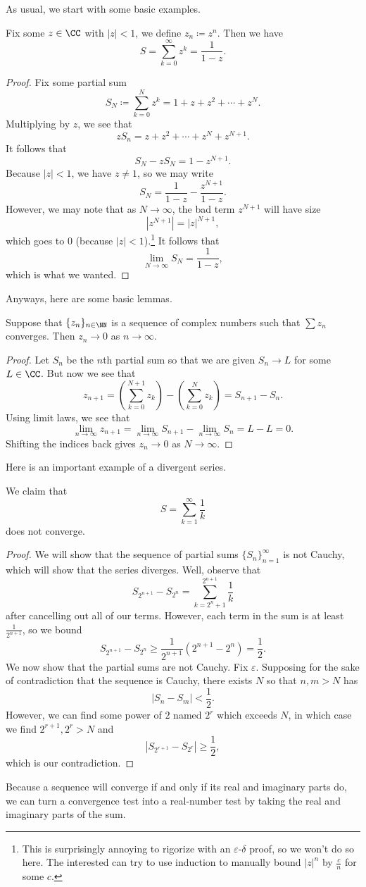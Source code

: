 \documentclass[../notes.tex]{subfiles}
\begin{document}
As usual, we start with some basic examples.
\begin{exe}
	Fix some $z\in\CC$ with $|z|<1$, we define $z_n\coloneqq z^n$. Then we have
	\[S=\sum_{k=0}^\infty z^k=\frac1{1-z}.\]
\end{exe}
\begin{proof}
	Fix some partial sum
	\[S_N\coloneqq\sum_{k=0}^Nz^k=1+z+z^2+\cdots+z^N.\]
	Multiplying by $z$, we see that
	\[zS_n=z+z^2+\cdots+ z^N+z^{N+1}.\]
	It follows that
	\[S_N-zS_N=1-z^{N+1}.\]
	Because $|z|<1$, we have $z\ne1$, so we may write
	\[S_N=\frac1{1-z}-\frac{z^{N+1}}{1-z}.\]
	However, we may note that as $N\to\infty$, the bad term $z^{N+1}$ will have size
	\[\left|z^{N+1}\right|=|z|^{N+1},\]
	which goes to $0$ (because $|z|<1$).\footnote{This is surprisingly annoying to rigorize with an $\varepsilon$-$\delta$ proof, so we won't do so here. The interested can try to use induction to manually bound $|z|^n$ by $\frac cn$ for some $c$.} It follows that
	\[\lim_{N\to\infty}S_N=\frac1{1-z},\]
	which is what we wanted.
\end{proof}
Anyways, here are some basic lemmas.
\begin{lemma} \label{lem:divtest}
	Suppose that $\{z_n\}_{n\in\NN}$ is a sequence of complex numbers such that $\sum z_n$ converges. Then $z_n\to0$ as $n\to\infty$.
\end{lemma}
\begin{proof}
	Let $S_n$ be the $n$th partial sum so that we are given $S_n\to L$ for some $L\in\CC$. But now we see that
	\[z_{n+1}=\left(\sum_{k=0}^{N+1}z_k\right)-\left(\sum_{k=0}^{N}z_k\right)=S_{n+1}-S_n.\]
	Using limit laws, we see that
	\[\lim_{n\to\infty}z_{n+1}=\lim_{n\to\infty}S_{n+1}-\lim_{n\to\infty}S_n=L-L=0.\]
	Shifting the indices back gives $z_n\to0$ as $N\to\infty$.
\end{proof}
Here is an important example of a divergent series.
\begin{exe}
	We claim that
	\[S=\sum_{k=1}^\infty\frac1k\]
	does not converge.
\end{exe}
\begin{proof}
	We will show that the sequence of partial sums $\{S_n\}_{n=1}^\infty$ is not Cauchy, which will show that the series diverges. Well, observe that
	\[S_{2^{n+1}}-S_{2^n}=\sum_{k=2^n+1}^{2^{n+1}}\frac1k\]
	after cancelling out all of our terms. However, each term in the sum is at least $\frac1{2^{n+1}}$, so we bound
	\[S_{2^{n+1}}-S_{2^n}\ge\frac1{2^{n+1}}\left(2^{n+1}-2^n\right)=\frac12.\]
	We now show that the partial sums are not Cauchy. Fix $\varepsilon$. Supposing for the sake of contradiction that the sequence is Cauchy, there exists $N$ so that $n,m>N$ has
	\[|S_n-S_m|<\frac12.\]
	However, we can find some power of $2$ named $2^r$ which exceeds $N$, in which case we find $2^{r+1},2^r>N$ and
	\[|S_{2^{r+1}}-S_{2^r}|\ge\frac12,\]
	which is our contradiction.
\end{proof}
\begin{remark}
	Because a sequence will converge if and only if its real and imaginary parts do, we can turn a convergence test into a real-number test by taking the real and imaginary parts of the sum.
\end{remark}
\end{document}
